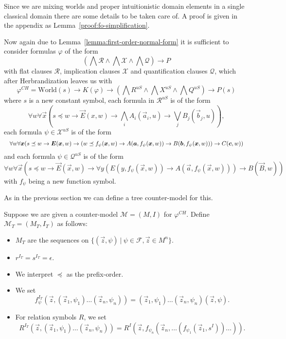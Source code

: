 \documentclass[runningheads]{llncs}
\begin{document}
Since we are mixing worlds and proper intuitionistic domain elements in a single classical domain there are some details to be taken care of. A proof is given in the appendix as Lemma~\ref{proof:fo-simplification}.


Now again due to Lemma~\ref{lemma:first-order-normal-form} it is sufficient to consider formulas $\varphi$ of the form $$\left(\bigwedge\mathcal R\wedge\bigwedge\mathcal X\wedge\bigwedge\mathcal Q\right)\to P$$ with flat clauses $\mathcal R$, implication clauses $\mathcal X$ and quantification clauses $\mathcal Q$, which after Herbrandization leaves us with $$\varphi^{CH} = \text{World}(s)\to K(\varphi)\to\left(\bigwedge R^{uS}\wedge \bigwedge X^{uS}\wedge\bigwedge Q^{uS}\right)\to P(s)$$
where $s$ is a new constant symbol, each formula in $\mathcal R^{uS}$ is of the form
$$\forall w \forall \vec x(s\preceq w\to\vec E(x, w)\to\bigwedge_i A_i(\vec a_i, u)\to\bigvee_j B_j(\vec b_j, u)),$$
each formula $\psi\in\mathcal X^{uS}$ is of the form
$$
	\resizebox{\hsize}{!}{$\forall w\forall\vec x(s\preceq w\to\vec E(\vec x, w)\to (w\preceq f_\psi(\vec x, w)\to A(\vec a, f_\psi(\vec x, w))\to B(\vec b, f_\psi(\vec x, w)))\to C(\vec c, w))$}
$$
and each formula $\psi\in\mathcal Q^{uS}$ is of the form
$$\forall w\forall\vec x(s\preceq w\to\vec E(\vec x, w)\to \forall y(E(y, f_\psi(\vec x, w))\to A(\vec a, f_\psi(\vec x, w)))\to B(\vec B, w))$$
with $f_\psi$ being a new function symbol.

As in the previous section we can define a tree counter-model for this.
\begin{definition}
	Suppose we are given a counter-model $\mathcal M = (M, I)$ for $\varphi^{CH}$. Define $\mathcal M_T = (M_T, I_T)$ as follows:
	\begin{itemize}
		\item $M_T$ are the sequences on $\{(\vec z, \psi)\:|\:\psi\in \mathcal F, \vec z\in M^n\}$.
		\item $r^{I_T} = s^{I_T} = \epsilon$.
		\item We interpret $\preceq$ as the prefix-order.
		\item We set $$f_\psi^{I_T}(\vec z, (\vec z_1, \psi_1)\dots (\vec z_n, \psi_n)) = (\vec z_1, \psi_1)\dots (\vec z_n, \psi_n)(\vec z, \psi).$$
		\item For relation symbols $R$, we set $${R}^{I_T}(\vec z, (\vec z_1, \psi_1)\dots (\vec z_n, \psi_n)) = {R}^I(\vec z, f_{\psi_n}(\vec z_n, \dots(f_{\psi_1}(\vec z_1, s^I))\dots)).$$
	\end{itemize}
\end{definition}
\end{document}
